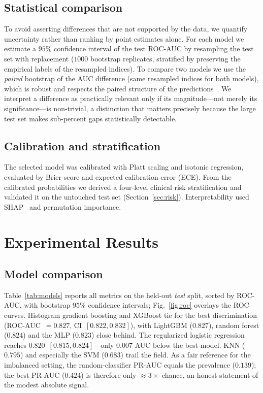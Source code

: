 \documentclass[conference]{IEEEtran}
\begin{document}
\subsection{Statistical comparison}
To avoid asserting differences that are not supported by the data, we quantify
uncertainty rather than ranking by point estimates alone. For each model we estimate a
$95\%$ confidence interval of the test ROC-AUC by resampling the test set with replacement
($1000$ bootstrap replicates, stratified by preserving the empirical labels of the
resampled indices). To compare two models we use the \emph{paired} bootstrap of the AUC
difference (same resampled indices for both models), which is robust and respects the
paired structure of the predictions~\cite{demsar2006statistical}. We interpret a
difference as practically relevant only if its magnitude---not merely its
significance---is non-trivial, a distinction that matters precisely because the large test
set makes sub-percent gaps statistically detectable.

\subsection{Calibration and stratification}
The selected model was calibrated with Platt scaling and isotonic regression, evaluated
by Brier score and expected calibration error (ECE). From the calibrated probabilities
we derived a four-level clinical risk stratification and validated it on the untouched
test set (Section~\ref{sec:risk}). Interpretability used SHAP~\cite{lundberg2017shap,
lundberg2020local} and permutation importance.

\section{Experimental Results}
\subsection{Model comparison}
Table~\ref{tab:models} reports all metrics on the held-out \emph{test} split, sorted by
ROC-AUC, with bootstrap $95\%$ confidence intervals; Fig.~\ref{fig:roc} overlays the ROC
curves. Histogram gradient boosting and XGBoost tie for the best discrimination
(ROC-AUC~$=0.827$, CI~$[0.822,0.832]$), with LightGBM ($0.827$), random forest ($0.824$)
and the MLP ($0.823$) close behind. The regularized logistic regression reaches
$0.820$~$[0.815,0.824]$---only $0.007$ AUC below the best model. KNN ($0.795$) and
especially the SVM ($0.683$) trail the field. As a fair reference for the imbalanced
setting, the random-classifier PR-AUC equals the prevalence ($0.139$); the best PR-AUC
($0.424$) is therefore only $\approx3\times$ chance, an honest statement of the modest
absolute signal.
\end{document}
